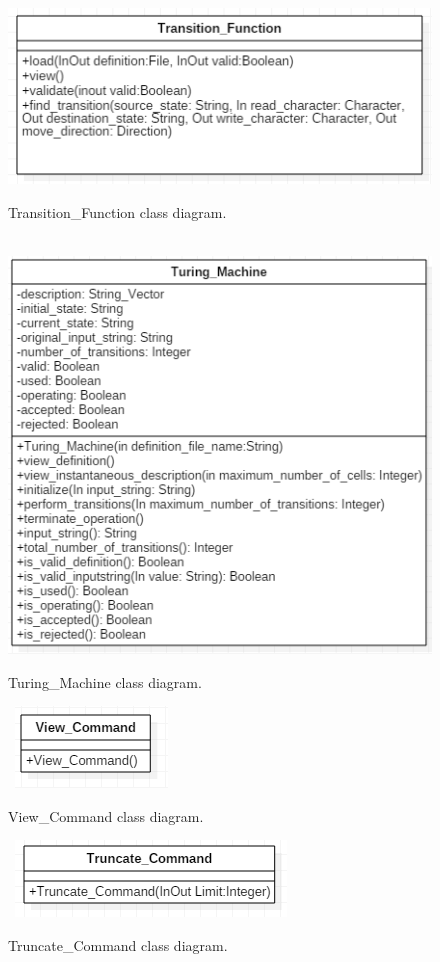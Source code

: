 \documentclass{report}
\begin{document}
\begin{figure}[!ht]
  	\centering
	\
    \includegraphics[scale=0.90]{Transition_Function.png}
  \caption{Transition\_Function class diagram.}
\end{figure}

\begin{figure}[!ht]
  	\centering
	\
    \includegraphics[scale=0.90]{Turing_Machine.png} 
  \caption{Turing\_Machine class diagram.}
\end{figure}

\begin{figure}[!ht]
  	\centering
	\
    \includegraphics[scale=0.90]{View_Command.png}
  \caption{View\_Command class diagram.}
\end{figure}

\begin{figure}[!ht]
  	\centering
	\
    \includegraphics[scale=0.90]{Truncate_Command.png}
  \caption{Truncate\_Command class diagram.}
\end{figure}
\end{document}
